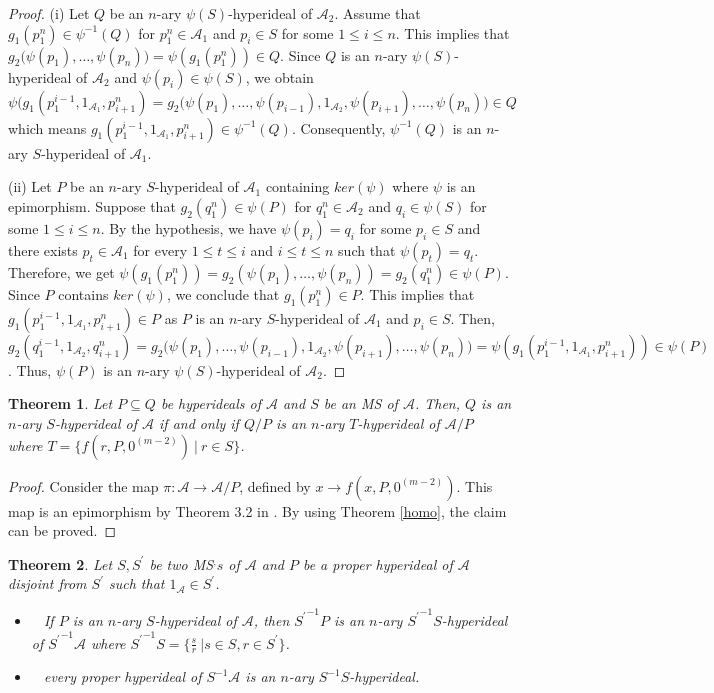 \documentclass[preprint,review,10pt]{amsart}
\newtheorem{theorem}{Theorem}[section]
\theoremstyle{definition}
\theoremstyle{remark}
\numberwithin{equation}{section}
\begin{document}
\begin{proof}
(i) Let $Q$ be an $n$-ary $\psi(S)$-hyperideal of $\mathscr{A}_2$. Assume that  $g_1(p_1^n) \in \psi^{-1}(Q)$ for $p_1^n \in \mathscr{A}_1$ and $p_i \in S$ for some $1 \leq i \leq n$. This implies that $g_2 \big(\psi(p_1),\ldots,\psi(p_n) \big)=\psi(g_1(p_1^n)) \in Q$. Since $Q$ is an $n$-ary $\psi(S)$-hyperideal of $\mathscr{A}_2$ and $\psi(p_i) \in \psi(S)$, we obtain $\psi(g_1(p_1^{i-1},1_{\mathscr{A}_1},p_{i+1}^n)=g_2 \big(\psi(p_1),\ldots,\psi(p_{i-1}),1_{\mathscr{A}_2},\psi(p_{i+1}),\ldots,\psi(p_n)\big) \in Q$ which means $g_1(p_1^{i-1},1_{\mathscr{A}_1},p_{i+1}^n) \in \psi^{-1}(Q)$. Consequently, $\psi^{-1}(Q)$ is an $n$-ary $S$-hyperideal of $\mathscr{A}_1$.

(ii) Let $P$ be an $n$-ary $S$-hyperideal of $\mathscr{A}_1$ containing $ker (\psi)$ where $\psi$ is an epimorphism.  Suppose that $g_2(q_1^n) \in \psi(P)$ for $q_1^n \in \mathscr{A}_2$ and $q_i \in \psi(S)$ for some $1 \leq i \leq n$. By the hypothesis, we have $\psi(p_i) =q_i$ for some $ p_i \in S$ and there exists $p_t \in \mathscr{A}_1$ for every $1 \leq t \leq i$ and $i \leq t \leq n$ such that $\psi(p_t)=q_t$. Therefore,  we get $\psi(g_1(p_1^n))=g_2(\psi(p_1),\ldots,\psi(p_n))=g_2(q_1^n) \in \psi(P)$. Since $P$ contains $ker (\psi)$, we conclude that $g_1(p_1^n) \in P$. This implies that $g_1(p_1^{i-1},1_{\mathscr{A}_1},p_{i+1}^n) \in P$ as $P$ is  an $n$-ary $S$-hyperideal of $\mathscr{A}_1$ and $p_i \in S$. Then,  $g_2 (q_1^{i-1},1_{\mathscr{A}_2},q_{i+1}^n)=g_2 \big(\psi(p_1),\ldots,\psi(p_{i-1}),1_{\mathscr{A}_2},\psi(p_{i+1}),\ldots,\psi(p_n)\big)=\psi(g_1(p_1^{i-1},1_{\mathscr{A}_1},p_{i+1}^n)) \in \psi(P)$. Thus, $\psi(P)$ is an $n$-ary $\psi(S)$-hyperideal of $\mathscr{A}_2$.
\end{proof}
\begin{theorem}
Let $P \subseteq Q$ be hyperideals of $\mathscr{A}$ and $S$ be an MS of  $\mathscr{A}$. Then, $Q$ is an $n$-ary $S$-hyperideal of $\mathscr{A}$ if and only if $Q/P$ is an $n$-ary $T$-hyperideal of $\mathscr{A}/P$ where $T=\{f(r,P,0^{(m-2)}) \ \vert \ r \in S \}$.
\end{theorem}
\begin{proof}
Consider the map $\pi :\mathscr{A} \longrightarrow \mathscr{A}/P$, defined by $x \longrightarrow f(x,P,0^{(m-2)})$. This map is an epimorphism by Theorem 3.2 in \cite{sorc1}. By
using Theorem \ref{homo}, the claim can be proved.
\end{proof}
\begin{theorem}
Let $S,S^{\prime}$ be two MS$^,s$ of  $\mathscr{A}$ and $P$ be a proper hyperideal of $\mathscr{A}$ disjoint from $S^{\prime}$ such that $1_\mathscr{A} \in S^{\prime}$.  
\begin{itemize} 
\item[\rm{{\bf (1)}}]~ 
If $P$ is an $n$-ary $S$-hyperideal of $\mathscr{A}$, then ${S^{\prime}}^{-1} P$ is an $n$-ary ${S^{\prime}}^{-1} S$-hyperideal of ${S^{\prime}}^{-1} \mathscr{A}$ where ${S^{\prime}}^{-1} S=\{\frac{s}{r} \ \vert s \in S, r \in S^{\prime}\}$.
\item[\rm{{\bf (2)}}]~ every  proper hyperideal of $S^{-1} \mathscr{A}$ is an $n$-ary $S^{-1} S$-hyperideal.
\end{itemize}
\end{theorem}
\end{document}
